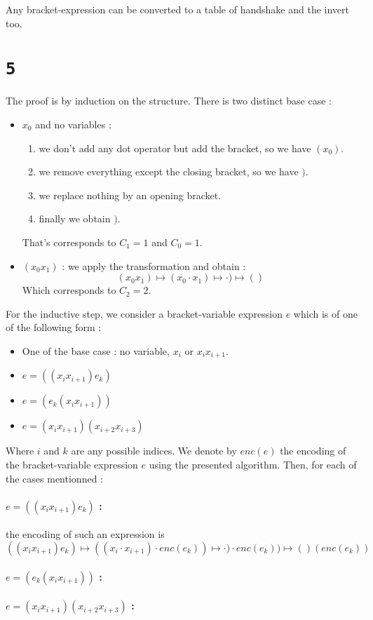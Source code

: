 \documentclass[a4paper,11pt]{report}
\begin{document}
Any bracket-expression can be converted to a table of handshake and the invert
too.

\section*{\texttt{5}}

The proof is by induction on the structure. There is two distinct base case :
\begin{itemize}
\item $x_0$ and  no variables :
  \begin{enumerate}
  \item we don't add any dot operator but add the bracket, so we have $(x_0)$.
  \item we remove everything except the closing bracket, so we have $)$.
  \item we replace nothing by an opening bracket.
  \item finally we obtain $)$.
  \end{enumerate}
  That's corresponds to $C_1 = 1$ and $C_0 = 1$.
\item $(x_0x_1)$ : we apply the transformation and obtain :
  \[
    (x_0x_1) \mapsto (x_0 \cdot x_1) \mapsto \cdot ) \mapsto ()
  \]
  Which corresponds to $C_2 = 2$.
\end{itemize}

For the inductive step, we consider a bracket-variable expression $e$ which is
of one of the following form :
\begin{itemize}
\item One of the base case : no variable, $x_i$ or $x_ix_{i+1}$.
\item $e = ((x_ix_{i+1})e_k)$
\item $e = (e_k(x_ix_{i+1}))$
\item $e = (x_ix_{i+1})(x_{i+2}x_{i+3})$
\end{itemize}

Where $i$ and $k$ are any possible indices. We denote by $enc(e)$ the encoding
of the bracket-variable expression $e$ using the presented algorithm. Then, for
each of the cases mentionned :

\paragraph{$e = ((x_ix_{i+1})e_k)$ :} the encoding of such an expression is
\[
  ((x_ix_{i+1})e_k) \mapsto ((x_i \cdot x_{i+1}) \cdot enc(e_k)) \mapsto \cdot )
  \cdot enc(e_k) ) \mapsto ()(enc(e_k))
\]

\paragraph{$e = (e_k(x_ix_{i+1}))$ :}

\paragraph{$e = (x_ix_{i+1})(x_{i+2}x_{i+3})$ :}
\end{document}
